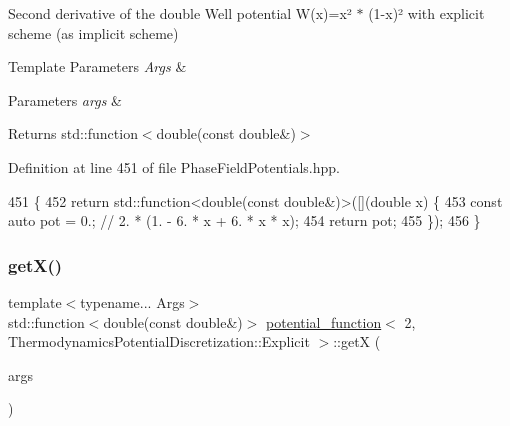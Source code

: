 Second derivative of the double Well potential W(x)=x² $\ast$ (1-\/x)² with explicit scheme (as implicit scheme) 


\begin{DoxyTemplParams}{Template Parameters}
{\em Args} & \\
\hline
\end{DoxyTemplParams}

\begin{DoxyParams}{Parameters}
{\em args} & \\
\hline
\end{DoxyParams}
\begin{DoxyReturn}{Returns}
std\+::function$<$double(const double\&)$>$ 
\end{DoxyReturn}


Definition at line 451 of file Phase\+Field\+Potentials.\+hpp.


\begin{DoxyCode}
451                                                         \{
452     \textcolor{keywordflow}{return} std::function<double(const double&)>([](\textcolor{keywordtype}{double} x) \{
453       \textcolor{keyword}{const} \textcolor{keyword}{auto} pot = 0.;  \textcolor{comment}{// 2. * (1. - 6. * x + 6. * x * x);}
454       \textcolor{keywordflow}{return} pot;
455     \});
456   \}
\end{DoxyCode}
\mbox{\label{structpotential__function_3_012_00_01ThermodynamicsPotentialDiscretization_1_1Explicit_01_4_a895c9365ab65a8d7836b3ac03159223c}} 
\subsubsection{\texorpdfstring{get\+X()}{getX()}}
{\footnotesize\ttfamily template$<$typename... Args$>$ \\
std\+::function$<$double(const double\&)$>$ \hyperlink{structpotential__function}{potential\+\_\+function}$<$ 2, Thermodynamics\+Potential\+Discretization\+::\+Explicit $>$\+::getX (\begin{DoxyParamCaption}\item[{Args...}]{args }\end{DoxyParamCaption})\hspace{0.3cm}{\ttfamily [inline]}}




